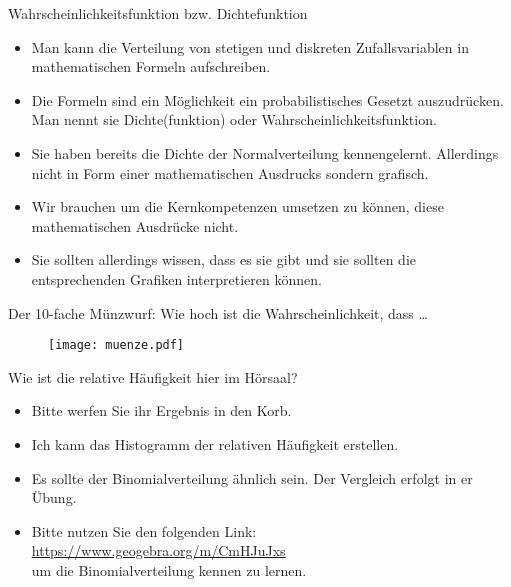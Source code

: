 \documentclass[usenames,dvipsnames,handout]{beamer}
\newcommand{\oldtextdied}{{\fontfamily{cmr}\selectfont\textdied}}
\newcommand{\oldtextborn}{{\fontfamily{cmr}\selectfont\textborn}}
\begin{document}
\begin{frame}{Wahrscheinlichkeitsfunktion bzw. Dichtefunktion}
\begin{itemize}
\item{Man kann die Verteilung von stetigen und diskreten Zufallsvariablen in mathematischen Formeln
aufschreiben. }\pause
\item{Die Formeln sind ein Möglichkeit ein probabilistisches Gesetzt auszudrücken. Man nennt sie Dichte(funktion)
oder Wahrscheinlichkeitsfunktion.}\pause
\item{Sie haben bereits die Dichte der Normalverteilung kennengelernt. Allerdings nicht in Form
einer mathematischen Ausdrucks sondern grafisch.}\pause
\item{Wir brauchen um die Kernkompetenzen umsetzen zu können, diese mathematischen Ausdrücke nicht.}\pause
\item{Sie sollten allerdings wissen, dass es sie gibt und sie sollten die entsprechenden Grafiken interpretieren können.}
\end{itemize}
\end{frame}

\begin{frame}{Der 10-fache Münzwurf: Wie hoch ist die Wahrscheinlichkeit, dass \dots}
  \begin{figure}[ht]
 	\centering
 	      \texttt{[image: muenze.pdf]}
 	\end{figure}
\end{frame}

\begin{frame}{Wie ist die relative Häufigkeit hier im Hörsaal?}
\begin{itemize}
\item{Bitte werfen Sie ihr Ergebnis in den Korb.}
\item{Ich kann das Histogramm der relativen Häufigkeit erstellen.}
\item{Es sollte der Binomialverteilung ähnlich sein. Der Vergleich erfolgt in er Übung.}
\item{Bitte nutzen Sie den folgenden Link: \url{https://www.geogebra.org/m/CmHJuJxs}\\
um die Binomialverteilung kennen zu lernen.}
\end{itemize}
\end{frame}
\end{document}
